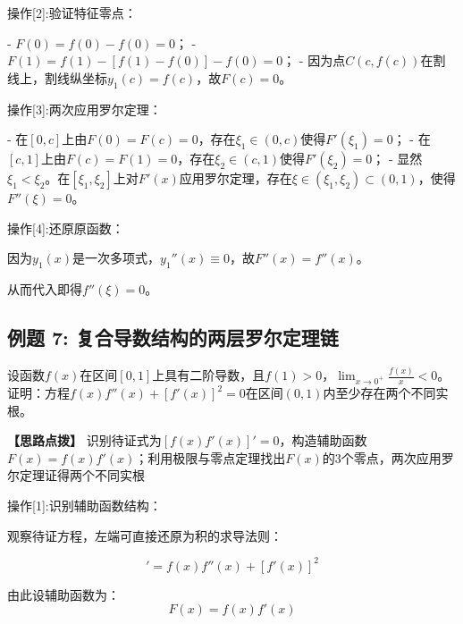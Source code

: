 \documentclass[11pt,a4paper,UTF8]{ctexart}
\begin{document}
操作[2]:验证特征零点：

\begin{solbox}[分步推导与答题规范]
- $F(0) = f(0) - f(0) = 0$；
- $F(1) = f(1) - [f(1) - f(0)] - f(0) = 0$；
- 因为点$C(c, f(c))$在割线上，割线纵坐标$y_1(c) = f(c)$，故$F(c) = 0$。
\end{solbox}

操作[3]:两次应用罗尔定理：

\begin{solbox}[分步推导与答题规范]
- 在$[0, c]$上由$F(0) = F(c) = 0$，存在$\xi_1 \in (0, c)$使得$F'(\xi_1) = 0$；
- 在$[c, 1]$上由$F(c) = F(1) = 0$，存在$\xi_2 \in (c, 1)$使得$F'(\xi_2) = 0$；
- 显然$\xi_1 < \xi_2$。在$[\xi_1, \xi_2]$上对$F'(x)$应用罗尔定理，存在$\xi \in (\xi_1, \xi_2) \subset (0, 1)$，使得$F''(\xi) = 0$。
\end{solbox}

操作[4]:还原原函数：

\begin{solbox}[分步推导与答题规范]
因为$y_1(x)$是一次多项式，$y_1''(x) \equiv 0$，故$F''(x) = f''(x)$。

从而代入即得$f''(\xi) = 0$。
\end{solbox}


\subsection{例题 7: 复合导数结构的两层罗尔定理链}

设函数$f(x)$在区间$[0, 1]$上具有二阶导数，且$f(1) > 0$，$\lim_{x \to 0^+} \frac{f(x)}{x} < 0$。证明：方程$f(x)f''(x) + [f'(x)]^2 = 0$在区间$(0, 1)$内至少存在两个不同实根。

\textbf{\color{DeepPurple}【思路点拨】} 识别待证式为$[f(x)f'(x)]' = 0$，构造辅助函数$F(x) = f(x)f'(x)$；利用极限与零点定理找出$F(x)$的3个零点，两次应用罗尔定理证得两个不同实根


操作[1]:识别辅助函数结构：

\begin{solbox}[分步推导与答题规范]
观察待证方程，左端可直接还原为积的求导法则：


\begin{equation*}
[f(x)f'(x)]' = f(x)f''(x) + [f'(x)]^2
\end{equation*}


由此设辅助函数为：
\begin{equation*}
F(x) = f(x)f'(x)
\end{equation*}

\end{solbox}
\end{document}
